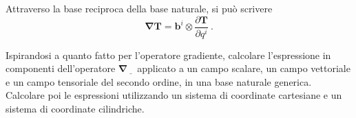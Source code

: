 \noindent
Attraverso la base reciproca della base naturale, si può scrivere
\begin{equation}
    \bm{\nabla} \bm{T} = \bm{b}^i \otimes \dfrac{\partial \bm{T}}{\partial q^i} \ .
\end{equation}

\begin{exercise}
 Ispirandosi a quanto fatto per l'operatore gradiente, calcolare l'espressione in componenti dell'operatore $\bm{\nabla}\underline{\hspace{8pt}}$ applicato a un campo scalare, un campo vettoriale e un campo tensoriale del secondo ordine, in una base naturale generica. Calcolare poi le espressioni utilizzando un sistema di coordinate cartesiane e un sistema di coordinate cilindriche. 
\end{exercise}

 
